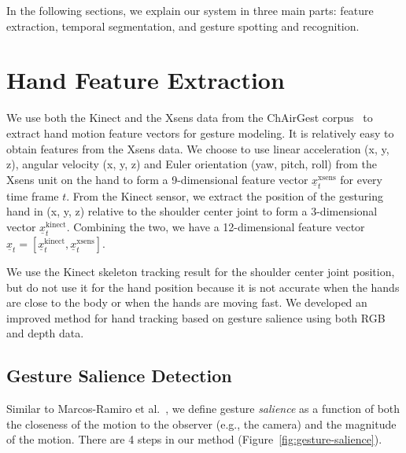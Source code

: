 \documentclass{sig-alternate-2013}
\begin{document}
In the following sections, we explain our system in three main parts: feature extraction, temporal segmentation, and gesture
spotting and recognition.  

\section{Hand Feature Extraction}
We use both the Kinect and the Xsens data from the ChAirGest corpus~\cite{Ruffieux2013} to
extract hand motion feature vectors for gesture modeling.
It is relatively easy to obtain features from the Xsens data. We choose to use linear
acceleration (x, y, z), angular velocity (x, y, z) and Euler orientation (yaw, pitch, roll)
from the Xsens unit on the hand to form a 9-dimensional feature vector $\underline{x}_t^{\text{xsens}}$
for every time frame $t$.
From the Kinect sensor, we extract the position of the gesturing hand in (x, y, z) relative to
the shoulder center joint to
form a 3-dimensional vector $\underline{x}_t^{\text{kinect}}$. Combining the two, we
have a 12-dimensional feature vector $\underline{x}_t = [\underline{x}^\text{kinect}_t, \underline{x}^\text{xsens}_t]$.

We use the Kinect skeleton tracking result for the shoulder center joint position,
but do not use it for the hand position because
it is not accurate when the hands are close to the body or when the hands are moving fast.
We developed an improved method for hand tracking based on gesture salience using both
RGB and depth data.

\subsection{Gesture Salience Detection}
Similar to Marcos-Ramiro et al.~\cite{marcos2013}, we define gesture
\textit{salience} as a function of both the closeness of the motion to the
observer (e.g., the camera) and the magnitude of the motion.
There are 4 steps in our method (Figure~\ref{fig:gesture-salience}). 
\end{document}
